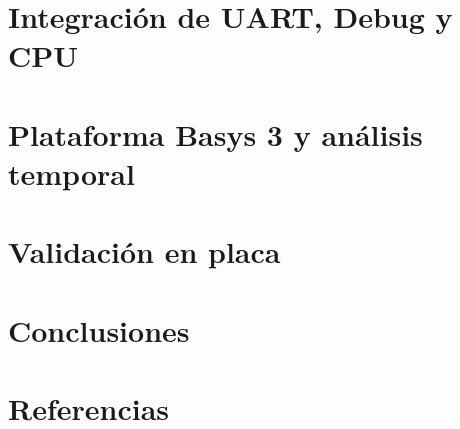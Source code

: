 \documentclass[12pt,a4paper,openany]{book}
\begin{document}
\chapter{Integración de UART, Debug y CPU}\label{chap:integracion-sistema}


\chapter{Plataforma Basys 3 y análisis temporal}\label{chap:plataforma-timing}


\chapter{Validación en placa}\label{chap:aceptacion-fisica}


\chapter{Conclusiones}\label{chap:conclusiones}


\chapter*{Referencias}

\end{document}
